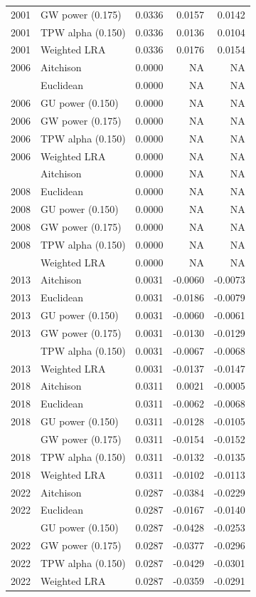 \begin{longtable}[t]{rlrrr}
2001 & GW power (0.175) & 0.0336 & 0.0157 & 0.0142\\
2001 & TPW alpha (0.150) & 0.0336 & 0.0136 & 0.0104\\
2001 & Weighted LRA & 0.0336 & 0.0176 & 0.0154\\
2006 & Aitchison & 0.0000 & NA & NA\\
\addlinespace
2006 & Euclidean & 0.0000 & NA & NA\\
2006 & GU power (0.150) & 0.0000 & NA & NA\\
2006 & GW power (0.175) & 0.0000 & NA & NA\\
2006 & TPW alpha (0.150) & 0.0000 & NA & NA\\
2006 & Weighted LRA & 0.0000 & NA & NA\\
\addlinespace
2008 & Aitchison & 0.0000 & NA & NA\\
2008 & Euclidean & 0.0000 & NA & NA\\
2008 & GU power (0.150) & 0.0000 & NA & NA\\
2008 & GW power (0.175) & 0.0000 & NA & NA\\
2008 & TPW alpha (0.150) & 0.0000 & NA & NA\\
\addlinespace
2008 & Weighted LRA & 0.0000 & NA & NA\\
2013 & Aitchison & 0.0031 & -0.0060 & -0.0073\\
2013 & Euclidean & 0.0031 & -0.0186 & -0.0079\\
2013 & GU power (0.150) & 0.0031 & -0.0060 & -0.0061\\
2013 & GW power (0.175) & 0.0031 & -0.0130 & -0.0129\\
\addlinespace
2013 & TPW alpha (0.150) & 0.0031 & -0.0067 & -0.0068\\
2013 & Weighted LRA & 0.0031 & -0.0137 & -0.0147\\
2018 & Aitchison & 0.0311 & 0.0021 & -0.0005\\
2018 & Euclidean & 0.0311 & -0.0062 & -0.0068\\
2018 & GU power (0.150) & 0.0311 & -0.0128 & -0.0105\\
\addlinespace
2018 & GW power (0.175) & 0.0311 & -0.0154 & -0.0152\\
2018 & TPW alpha (0.150) & 0.0311 & -0.0132 & -0.0135\\
2018 & Weighted LRA & 0.0311 & -0.0102 & -0.0113\\
2022 & Aitchison & 0.0287 & -0.0384 & -0.0229\\
2022 & Euclidean & 0.0287 & -0.0167 & -0.0140\\
\addlinespace
2022 & GU power (0.150) & 0.0287 & -0.0428 & -0.0253\\
2022 & GW power (0.175) & 0.0287 & -0.0377 & -0.0296\\
2022 & TPW alpha (0.150) & 0.0287 & -0.0429 & -0.0301\\
2022 & Weighted LRA & 0.0287 & -0.0359 & -0.0291\\
\bottomrule
\end{longtable}

